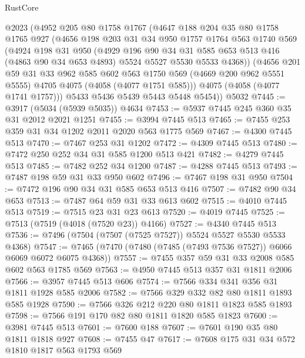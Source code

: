 \begin{lexlean}{RustCore}
\begin{coremodule}
    @2023
    (@4952
      @205
      @80
      @1758
      @1767
      (@4647
        @188
        @204
        @35
        @80
        @1758
        @1765
        @927
        (@4656
          @198
          @203
          @31
          @34
          @950
          @1757
          @1764
          @563
          @1740
          @569
          (@4924
            @198
            @31
            @950
            (@4929
              @196
              @90
              @34
              @31
              @585
              @653
              @513
              @416
              (@4863 @90 @34 @653 @4893)
              @5524
              @5527
              @5530
              @5533
              @4368))
          (@4656
            @201
            @59
            @31
            @33
            @962
            @585
            @602
            @563
            @1750
            @569
            (@4669 @200 @962 @5551 @5555)
            @4705
            @4075
            (@4058 (@4077 @1751 @585)))
          @4075
          (@4058 (@4077 @1741 @1757)))
        @5433
        @5436
        @5439
        @5443
        @5448
        @5454))
    @5032
@7445 := @3917 (@5034 (@5939 @5035)) @4634
@7453 := @5937 @7445 @245 @360 @35 @31 @2012 @2021 @1251
@7455 := @3994 @7445 @513
@7465 := @7455 @253 @359 @31 @34 @1202 @2011 @2020 @563 @1775 @569
@7467 := @4300 @7445 @513
@7470 := @7467 @253 @31 @1202
@7472 := @4309 @7445 @513
@7480 := @7472 @250 @252 @34 @31 @585 @1200 @513 @421
@7482 := @4279 @7445 @513
@7485 := @7482 @252 @34 @1200
@7487 := @4288 @7445 @513
@7493 := @7487 @198 @59 @31 @33 @950 @602
@7496 := @7467 @198 @31 @950
@7504 := @7472 @196 @90 @34 @31 @585 @653 @513 @416
@7507 := @7482 @90 @34 @653
@7513 := @7487 @64 @59 @31 @33 @613 @602
@7515 := @4010 @7445 @513
@7519 := @7515 @23 @31 @23 @613
@7520 := @4019 @7445
@7525 := @7513 (@7519 (@4018 (@7520 @23)) @4166)
@7527 := @4340 @7445 @513
@7536 := @7496 (@7504 (@7507 (@7525 @7527)) @5524 @5527 @5530 @5533 @4368)
@7547 := @7465 (@7470 (@7480 (@7485 (@7493 @7536 @7527)) @6066 @6069 @6072 @6075 @4368))
@7557 := @7455 @357 @59 @31 @33 @2008 @585 @602 @563 @1785 @569
@7563 := @4950 @7445 @513 @357 @31 @1811 @2006
@7566 := @3957 @7445 @513 @606
@7574 := @7566 @334 @341 @356 @31 @1811 @1928 @585 @2006
@7582 := @7566 @329 @332 @82 @80 @1811 @1893 @585 @1928
@7590 := @7566 @326 @212 @220 @80 @1811 @1823 @585 @1893
@7598 := @7566 @191 @170 @82 @80 @1811 @1820 @585 @1823
@7600 := @3981 @7445 @513
@7601 := @7600 @188
@7607 := @7601 @190 @35 @80 @1811 @1818 @927
@7608 := @7455 @47
@7617 := @7608 @175 @31 @34 @572 @1810 @1817 @563 @1793 @569

\end{coremodule}
\end{lexlean}
